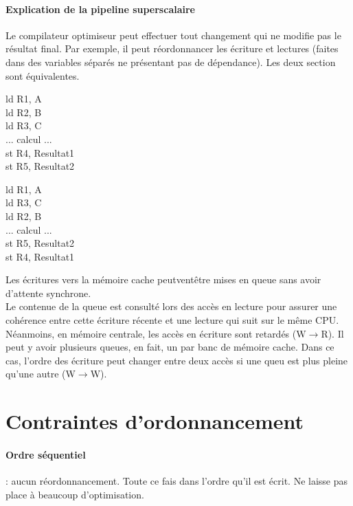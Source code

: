 \documentclass[oneside]{book}
\begin{document}
\paragraph{Explication de la pipeline superscalaire} Le compilateur optimiseur peut effectuer tout changement qui ne modifie pas le résultat final. Par exemple, il peut réordonnancer les écriture et lectures (faites dans des variables séparés ne présentant pas de dépendance). Les deux section sont équivalentes.
\begin{multicols}{2}

ld R1, A\\
ld R2, B\\
ld R3, C\\
... calcul ...\\
st R4, Resultat1\\
st R5, Resultat2\\

\columnbreak

ld R1, A\\
ld R3, C\\
ld R2, B\\
... calcul ...\\
st R5, Resultat2\\
st R4, Resultat1\\

\end{multicols}

Les écritures vers la mémoire cache peutventêtre mises en queue sans avoir d'attente synchrone.\\

Le contenue de la queue est consulté lors des accès en lecture pour assurer une cohérence entre cette écriture récente et une lecture qui suit sur le même CPU. Néanmoins, en mémoire centrale, les accès en écriture sont retardés (W$\rightarrow$R). Il peut y avoir plusieurs queues, en fait, un par banc de mémoire cache. Dans ce cas, l'ordre des écriture peut changer entre deux accès si une queu est plus pleine qu'une autre (W$\rightarrow$W).\\

\section{Contraintes d'ordonnancement}
\paragraph{Ordre séquentiel}: aucun réordonnancement. Toute ce fais dans l'ordre qu'il est écrit. Ne laisse pas place à beaucoup d'optimisation.
\end{document}
